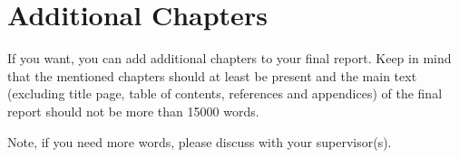 \chapter{Additional Chapters}\label{chap:additional_chapters}

If you want, you can add additional chapters to your final report. Keep in mind that the mentioned chapters should at least be present and the main text (excluding title page, table of contents, references and appendices) of the final report should not be more than 15000 words.

Note, if you need more words, please discuss with your supervisor(s).
